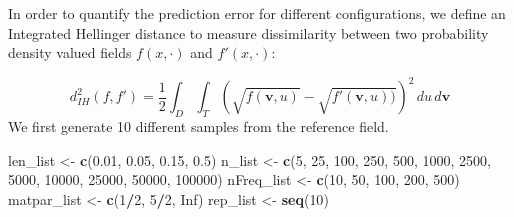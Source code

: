 \documentclass[
]{article}
\newenvironment{Shaded}{\begin{snugshade}}{\end{snugshade}}
\newcommand{\ConstantTok}[1]{\textcolor[rgb]{0.56,0.35,0.01}{#1}}
\newcommand{\DecValTok}[1]{\textcolor[rgb]{0.00,0.00,0.81}{#1}}
\newcommand{\FloatTok}[1]{\textcolor[rgb]{0.00,0.00,0.81}{#1}}
\newcommand{\FunctionTok}[1]{\textcolor[rgb]{0.13,0.29,0.53}{\textbf{#1}}}
\newcommand{\NormalTok}[1]{#1}
\newcommand{\OtherTok}[1]{\textcolor[rgb]{0.56,0.35,0.01}{#1}}
\newcommand{\SpecialCharTok}[1]{\textcolor[rgb]{0.81,0.36,0.00}{\textbf{#1}}}
\begin{document}
In order to quantify the prediction error for different configurations, we define an Integrated Hellinger distance to measure dissimilarity between two probability density valued fields \(f(x, \cdot)\) and \(f'(x, \cdot)\):

\[
d_{IH}^2(f , f' ) = \frac{1}{2}\int_D \int_T \left( \sqrt{f(\mathbf{v}, u)} - \sqrt{f'(\mathbf{v}, u))}  \right)^2 \,du \,d\mathbf{v}
\]
We first generate 10 different samples from the reference field.

\begin{Shaded}
\begin{Highlighting}[]
\NormalTok{len\_list }\OtherTok{\textless{}{-}} \FunctionTok{c}\NormalTok{(}\FloatTok{0.01}\NormalTok{, }\FloatTok{0.05}\NormalTok{, }\FloatTok{0.15}\NormalTok{, }\FloatTok{0.5}\NormalTok{)}
\NormalTok{n\_list }\OtherTok{\textless{}{-}} \FunctionTok{c}\NormalTok{(}\DecValTok{5}\NormalTok{, }\DecValTok{25}\NormalTok{, }\DecValTok{100}\NormalTok{, }
            \DecValTok{250}\NormalTok{, }\DecValTok{500}\NormalTok{, }\DecValTok{1000}\NormalTok{, }
            \DecValTok{2500}\NormalTok{, }\DecValTok{5000}\NormalTok{, }\DecValTok{10000}\NormalTok{, }
            \DecValTok{25000}\NormalTok{, }\DecValTok{50000}\NormalTok{, }\DecValTok{100000}\NormalTok{)}
\NormalTok{nFreq\_list }\OtherTok{\textless{}{-}} \FunctionTok{c}\NormalTok{(}\DecValTok{10}\NormalTok{, }\DecValTok{50}\NormalTok{, }\DecValTok{100}\NormalTok{, }\DecValTok{200}\NormalTok{, }\DecValTok{500}\NormalTok{)}
\NormalTok{matpar\_list }\OtherTok{\textless{}{-}} \FunctionTok{c}\NormalTok{(}\DecValTok{1}\SpecialCharTok{/}\DecValTok{2}\NormalTok{, }\DecValTok{5}\SpecialCharTok{/}\DecValTok{2}\NormalTok{, }\ConstantTok{Inf}\NormalTok{)}
\NormalTok{rep\_list }\OtherTok{\textless{}{-}} \FunctionTok{seq}\NormalTok{(}\DecValTok{10}\NormalTok{)}



\end{Highlighting}
\end{Shaded}
\end{document}

